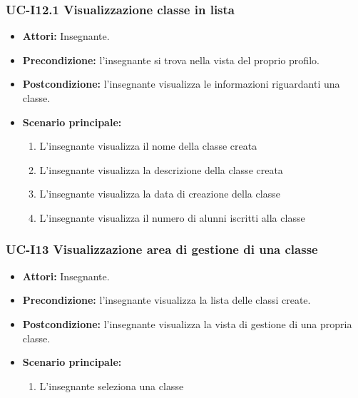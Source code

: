 \subsubsection{UC-I12.1 Visualizzazione classe in lista}		
\begin{itemize}
	\item \textbf{Attori:} Insegnante.
	\item \textbf{Precondizione:} l'insegnante si trova nella vista del proprio profilo.
	\item \textbf{Postcondizione:} l'insegnante visualizza le informazioni riguardanti una classe.
	\item \textbf{Scenario principale:}
	\begin{enumerate}
		\item L'insegnante visualizza il nome della classe creata
		\item L'insegnante visualizza la descrizione della classe creata
		\item L'insegnante visualizza la data di creazione della classe
		\item L'insegnante visualizza il numero di alunni iscritti alla classe
	\end{enumerate}		
\end{itemize}

\subsubsection{UC-I13 Visualizzazione area di gestione di una classe}
\begin{itemize}
	\item \textbf{Attori:} Insegnante.
	\item \textbf{Precondizione:} l'insegnante visualizza la lista delle classi create.
	\item \textbf{Postcondizione:} l'insegnante visualizza la vista di gestione di una propria classe.
	\item \textbf{Scenario principale:}
	\begin{enumerate}
		\item L'insegnante seleziona una classe
	\end{enumerate}
\end{itemize}

